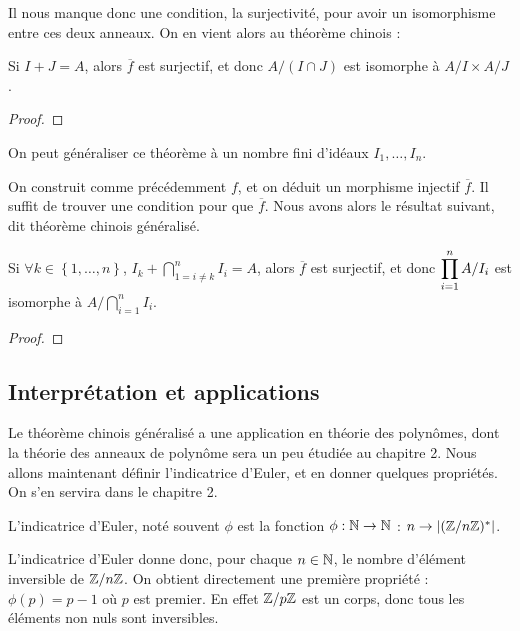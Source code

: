 Il nous manque donc une condition, la surjectivité, pour avoir un isomorphisme
entre ces deux anneaux.
On en vient alors au théorème chinois :

\begin{theorem}
	Si $I + J = A$, alors $\overline{f}$ est surjectif, et donc $A/(I \cap
	J)$ est isomorphe à $A/I \times A/J$.
\end{theorem}

\ifdefined\outputproof
\begin{proof}

\end{proof}
\fi

On peut généraliser ce théorème à un nombre fini d'idéaux $I_{1}, \ldots,
I_{n}$.

On construit comme précédemment $f$, et on déduit un morphisme injectif
$\overline{f}$. Il suffit de trouver une condition pour que $\overline{f}$. Nous
avons alors le résultat suivant, dit théorème chinois généralisé.

\begin{theorem}
	Si $\forall k \in \left\{1, \ldots, n\right\}$, $I_{k} + \displaystyle
	\bigcap_{1 = i \ne k}^{n} I_{i} = A$, alors $\overline{f}$ est surjectif, et
	donc $\displaystyle \prod_{i = 1}^{n} A/I_{i}$ est isomorphe à $\displaystyle A/\bigcap_{i = 1}^{n}
	I_{i}$.
\end{theorem}

\ifdefined\outputproof
\begin{proof}

\end{proof}
\fi

\subsection{Interprétation et applications}

Le théorème chinois généralisé a une application en théorie des polynômes, dont
la théorie des anneaux de polynôme sera un peu étudiée au chapitre 2.
Nous allons maintenant définir l'indicatrice d'Euler, et en donner quelques
propriétés.
On s'en servira dans le chapitre 2.

\begin{definition}
	L'indicatrice d'Euler, noté souvent $\phi$ est la fonction
	$\phi : \mathbb{N} \rightarrow \mathbb{N}$ : $n \rightarrow
	|(\mathbb{Z}/n\mathbb{Z})^{*}|$.
\end{definition}

L'indicatrice d'Euler donne donc, pour chaque $n \in \mathbb{N}$, le nombre
d'élément inversible de $\mathbb{Z}/n\mathbb{Z}$.
On obtient directement une première propriété : $\phi(p) = p - 1$ où $p$ est
premier. En effet $\mathbb{Z}/p\mathbb{Z}$ est un corps, donc tous les éléments non
nuls sont inversibles.

